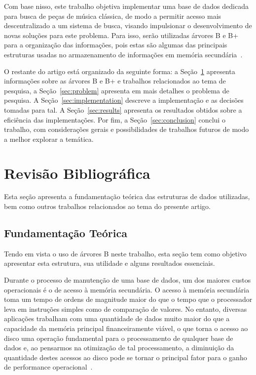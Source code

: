 \documentclass[12pt]{article}
\begin{document}
Com base nisso, este trabalho objetiva implementar uma base de dados dedicada
para busca de peças de música clássica, de modo a permitir acesso mais
descentralizado a um sistema de busca, visando impulsionar o desenvolvimento de
novas soluções para este problema.
Para isso, serão utilizadas árvores B e B+ para a organização das informações,
pois estas são algumas das principais estruturas usadas no armazenamento de
informações em memória secundária~\cite{Co:79}.

O restante do artigo está organizado da seguinte forma:
a Seção~\ref{sec:revisao} apresenta informações sobre as árvores B e B+ e
trabalhos relacionados ao tema de pesquisa, a Seção~\ref{sec:problem} apresenta
em mais detalhes o problema de pesquisa. A Seção~\ref{sec:implementation}
descreve a implementação e as decisões tomadas para tal. A Seção~\ref{sec:results}
apresenta os resultados obtidos sobre a eficiência das implementações.
Por fim, a Seção~\ref{sec:conclusion} conclui o trabalho, com considerações
gerais e possibilidades de trabalhos futuros de modo a melhor explorar a temática.



\section{Revisão Bibliográfica} \label{sec:revisao}
Esta seção apresenta a fundamentação teórica das estruturas de dados utilizadas,
bem como outros trabalhos relacionados ao tema do presente artigo.

\subsection{Fundamentação Teórica}
Tendo em vista o uso de árvores B neste trabalho, esta seção tem como objetivo 
apresentar esta estrutura, sua utilidade e alguns resultados essenciais.

Durante o processo de manutenção de uma base de dados, um dos maiores custos
operacionais é o de acesso à memória secundária.
O acesso à memória secundária toma um tempo de ordens de magnitude maior do que
o tempo que o processador leva em instruções simples como de comparação de valores.
No entanto, diversas aplicações trabalham com uma quantidade de dados muito maior
do que a capacidade da memória principal financeiramente viável, o que torna o
acesso ao disco uma operação fundamental para o processamento de qualquer base
de dados e, ao pensarmos na otimização de tal processamento, a diminuição da
quantidade destes acessos ao disco pode se tornar o principal fator para o ganho
de performance operacional~\cite{clrs:22}.
\end{document}
